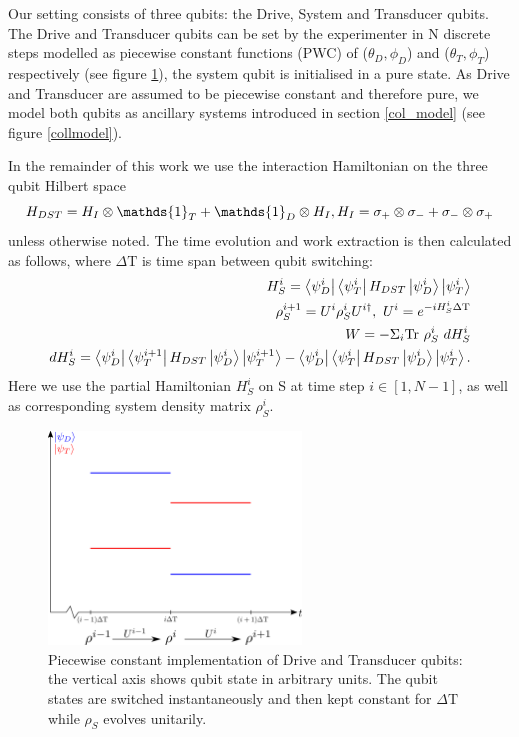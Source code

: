 Our setting consists of three qubits: the Drive, System and Transducer qubits. The Drive and Transducer qubits can be set by the experimenter in N discrete steps modelled as piecewise constant functions (PWC) of ($\theta_D, \phi_D$) and ($\theta_T, \phi_T$) respectively (see figure \ref{pwc}), the system qubit is initialised in a pure state.
As Drive and Transducer are assumed to be piecewise constant and therefore pure, we model both qubits as ancillary systems introduced in section \ref{col_model} (see figure \ref{collmodel}).

In the remainder of this work we use the interaction Hamiltonian on the three qubit Hilbert space
\begin{equation*}
	H_{DST} = H_{I} \otimes \mathds{1}_T + \mathds{1}_D \otimes H_{I}, \\
	H_{I} = \sigma_{+} \otimes \sigma_{-} + \sigma_{-} \otimes \sigma_{+}
\end{equation*}
unless otherwise noted.
The time evolution and work extraction is then calculated as follows, where $\Delta \mathrm{T}$ is time span between qubit switching:
\begin{align}
	H_S^i = \bra{\psi_D^i}\bra{\psi_T^i} H_{DST} \ket{\psi_D^i} \ket{\psi_T^i} \\
	\rho_S^{i+1} = U^i \rho_S^i U^{i\dagger}, \ U^i = e^{-iH_S^i \Delta \mathrm{T}} \\
	W = - \Sigma_i \mathrm{Tr} \ \rho_S^i \ dH_S^i \\
	dH_S^i = \bra{\psi_D^i}\bra{\psi_T^{i+1}} H_{DST} \ket{\psi_D^i} \ket{\psi_T^{i+1}} - \bra{\psi_D^i}\bra{\psi_T^i} H_{DST} \ket{\psi_D^i} \ket{\psi_T^i}.	
\end{align}
Here we use the partial Hamiltonian $H_S^i$ on S at time step $i \in [1, N - 1]$, as well as corresponding system density matrix $\rho_S^i$.


\begin{figure}
	\centering
	\includegraphics[width=0.6\textwidth]{img/pwc}
	\caption{Piecewise constant implementation of Drive and Transducer qubits: the vertical axis shows qubit state in arbitrary units. The qubit states are switched instantaneously and then kept constant for $\Delta \mathrm{T}$ while $\rho_S$ evolves unitarily.}
	\label{pwc}
\end{figure}

